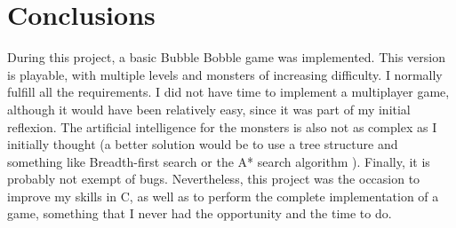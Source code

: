 \documentclass[12pt,a4paper]{article}
\newcommand{\cc}[1]{\texttt{#1}}
\begin{document}
\section{Conclusions}

During this project, a basic Bubble Bobble game was implemented. This version is playable, with multiple levels and monsters of increasing difficulty. I normally fulfill all the requirements. I did not have time to implement a multiplayer game, although it would have been relatively easy, since it was part of my initial reflexion. The artificial intelligence for the monsters is also not as complex as I initially thought (a better solution would be to use a tree structure and something like Breadth-first search \cite{bfs} or the A* search algorithm \cite{astar}). Finally, it is probably not exempt of bugs. Nevertheless, this project was the occasion to improve my skills in C, as well as to perform the complete implementation of a game, something that I never had the opportunity and the time to do. 

%
%
%


\end{document}
